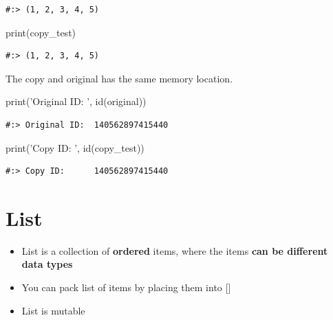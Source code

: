 \documentclass[
]{book}
\newenvironment{Shaded}{\begin{snugshade}}{\end{snugshade}}
\newcommand{\BuiltInTok}[1]{#1}
\newcommand{\NormalTok}[1]{#1}
\newcommand{\StringTok}[1]{\textcolor[rgb]{0.5,0.5,0.5}{#1}}
\providecommand{\tightlist}{%
  \setlength{\itemsep}{0pt}\setlength{\parskip}{0pt}}
\begin{document}
\begin{verbatim}
#:> (1, 2, 3, 4, 5)
\end{verbatim}

\begin{Shaded}
\begin{Highlighting}[]
\BuiltInTok{print}\NormalTok{(copy_test)}
\end{Highlighting}
\end{Shaded}

\begin{verbatim}
#:> (1, 2, 3, 4, 5)
\end{verbatim}

The copy and original has the same memory location.

\begin{Shaded}
\begin{Highlighting}[]
\BuiltInTok{print}\NormalTok{(}\StringTok{'Original ID: '}\NormalTok{, }\BuiltInTok{id}\NormalTok{(original))}
\end{Highlighting}
\end{Shaded}

\begin{verbatim}
#:> Original ID:  140562897415440
\end{verbatim}

\begin{Shaded}
\begin{Highlighting}[]
\BuiltInTok{print}\NormalTok{(}\StringTok{'Copy ID:     '}\NormalTok{, }\BuiltInTok{id}\NormalTok{(copy_test))}
\end{Highlighting}
\end{Shaded}

\begin{verbatim}
#:> Copy ID:      140562897415440
\end{verbatim}

\hypertarget{list}{%
\section{List}\label{list}}

\begin{itemize}
\tightlist
\item
  List is a collection of \textbf{ordered} items, where the items \textbf{can be different data types}\\
\item
  You can pack list of items by placing them into {[}{]}\\
\item
  List is mutable
\end{itemize}
\end{document}
